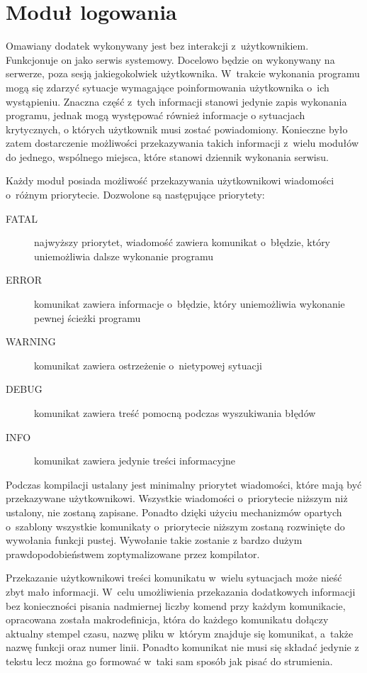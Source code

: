 \section[Moduł logowania][Moduł logowania]{Moduł logowania}

Omawiany dodatek wykonywany jest bez interakcji
z~użytkownikiem. Funkcjonuje on jako serwis systemowy. Docelowo będzie
on wykonywany na serwerze, poza sesją jakiegokolwiek
użytkownika. W~trakcie wykonania programu mogą się zdarzyć sytuacje
wymagające poinformowania użytkownika o~ich wystąpieniu. Znaczna część
z~tych informacji stanowi jedynie zapis wykonania programu, jednak
mogą występować również informacje o sytuacjach krytycznych, o których
użytkownik musi zostać powiadomiony. Konieczne było zatem dostarczenie
możliwości przekazywania takich informacji z~wielu modułów do jednego,
wspólnego miejsca, które stanowi dziennik wykonania serwisu.

Każdy moduł posiada możliwość przekazywania użytkownikowi wiadomości
o~różnym priorytecie. Dozwolone są następujące priorytety:

\begin{description}
\item[FATAL] najwyższy priorytet, wiadomość zawiera komunikat
  o~błędzie, który uniemożliwia dalsze wykonanie programu
\item[ERROR] komunikat zawiera informacje o~błędzie, który
  uniemożliwia wykonanie pewnej ścieżki programu
\item[WARNING] komunikat zawiera ostrzeżenie o~nietypowej sytuacji
\item[DEBUG] komunikat zawiera treść pomocną podczas wyszukiwania błędów
\item[INFO] komunikat zawiera jedynie treści informacyjne
\end{description}

Podczas kompilacji ustalany jest minimalny priorytet wiadomości, które
mają być przekazywane użytkownikowi. Wszystkie wiadomości
o~priorytecie niższym niż ustalony, nie zostaną zapisane. Ponadto
dzięki użyciu mechanizmów opartych o~szablony wszystkie komunikaty
o~priorytecie niższym zostaną rozwinięte do wywołania funkcji
pustej. Wywołanie takie zostanie z bardzo dużym prawdopodobieństwem
zoptymalizowane przez kompilator.

Przekazanie użytkownikowi treści komunikatu w~wielu sytuacjach może
nieść zbyt mało informacji. W~celu umożliwienia przekazania
dodatkowych informacji bez konieczności pisania nadmiernej liczby
komend przy każdym komunikacie, opracowana została makrodefinicja,
która do każdego komunikatu dołączy aktualny stempel czasu, nazwę
pliku w~którym znajduje się komunikat, a~także nazwę funkcji oraz
numer linii. Ponadto komunikat nie musi się składać jedynie z tekstu
lecz można go formować w~taki sam sposób jak pisać do strumienia.

